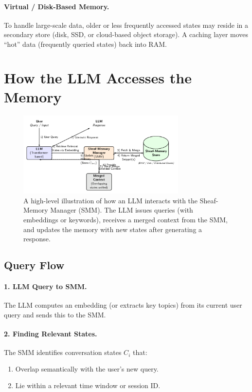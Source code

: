 \documentclass{article}
\begin{document}
\paragraph{Virtual / Disk-Based Memory.}
To handle large-scale data, older or less frequently accessed states may reside in a secondary store (disk, SSD, or cloud-based object storage). A caching layer moves “hot” data (frequently queried states) back into RAM.

\section{How the LLM Accesses the Memory}
\label{sec:llm_access}

\begin{figure}[t!]
\centering
\includegraphics[width=0.75\textwidth]{LLM_SheafMemoryDiagram.png}
\caption{A high-level illustration of how an LLM interacts with the Sheaf-Memory Manager (SMM). The LLM issues queries (with embeddings or keywords), receives a merged context from the SMM, and updates the memory with new states after generating a response.}
\label{fig:llm_sheafmem}
\end{figure}

\subsection{Query Flow}

\paragraph{1. LLM Query to SMM.}
The LLM computes an embedding (or extracts key topics) from its current user query and sends this to the SMM.

\paragraph{2. Finding Relevant States.}
The SMM identifies conversation states $C_i$ that:
\begin{enumerate}
    \item Overlap semantically with the user’s new query.
    \item Lie within a relevant time window or session ID.
\end{enumerate}
\end{document}

